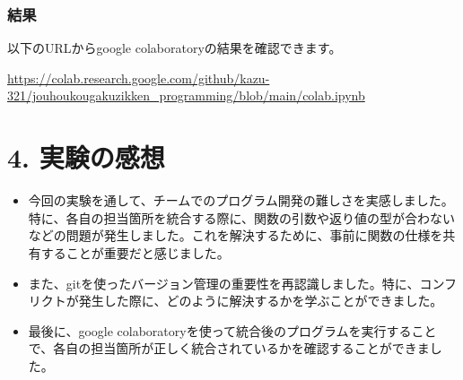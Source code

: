 \documentclass[a4paper,11pt]{jsarticle}
\begin{document}
\subsubsection*{結果}
以下のURLからgoogle colaboratoryの結果を確認できます。

\url{https://colab.research.google.com/github/kazu-321/jouhoukougakuzikken_programming/blob/main/colab.ipynb}

\section*{4. 実験の感想}
\begin{itemize}
    \item 今回の実験を通して、チームでのプログラム開発の難しさを実感しました。特に、各自の担当箇所を統合する際に、関数の引数や返り値の型が合わないなどの問題が発生しました。これを解決するために、事前に関数の仕様を共有することが重要だと感じました。
    \item また、gitを使ったバージョン管理の重要性を再認識しました。特に、コンフリクトが発生した際に、どのように解決するかを学ぶことができました。
    \item 最後に、google colaboratoryを使って統合後のプログラムを実行することで、各自の担当箇所が正しく統合されているかを確認することができました。
\end{itemize}
\end{document}

